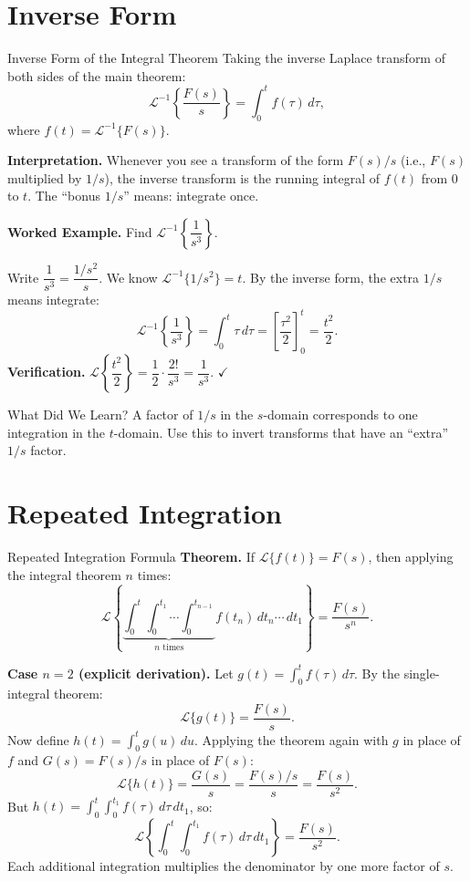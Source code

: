 \documentclass[12pt,a4paper]{article}
\begin{document}
\section{Inverse Form}

\begin{infobox}{Inverse Form of the Integral Theorem}
Taking the inverse Laplace transform of both sides of the main theorem:
\[
  \mathcal{L}^{-1}\!\left\{\frac{F(s)}{s}\right\} = \int_0^t f(\tau)\,d\tau,
\]
where $f(t) = \mathcal{L}^{-1}\{F(s)\}$.

\medskip
\noindent\textbf{Interpretation.} Whenever you see a transform of the form $F(s)/s$ (i.e.,
$F(s)$ multiplied by $1/s$), the inverse transform is the running integral of $f(t)$
from $0$ to $t$. The ``bonus $1/s$'' means: integrate once.

\medskip
\noindent\textbf{Worked Example.} Find $\mathcal{L}^{-1}\!\left\{\dfrac{1}{s^3}\right\}$.

Write $\dfrac{1}{s^3} = \dfrac{1/s^2}{s}$. We know $\mathcal{L}^{-1}\{1/s^2\} = t$.
By the inverse form, the extra $1/s$ means integrate:
\[
  \mathcal{L}^{-1}\!\left\{\frac{1}{s^3}\right\} = \int_0^t \tau\,d\tau
  = \left[\frac{\tau^2}{2}\right]_0^t = \frac{t^2}{2}.
\]
\textbf{Verification.} $\mathcal{L}\!\left\{\dfrac{t^2}{2}\right\}
= \dfrac{1}{2}\cdot\dfrac{2!}{s^3} = \dfrac{1}{s^3}$. $\checkmark$
\end{infobox}

\begin{learnbox}{What Did We Learn?}
A factor of $1/s$ in the $s$-domain corresponds to one integration in the $t$-domain.
Use this to invert transforms that have an ``extra'' $1/s$ factor.
\end{learnbox}

\section{Repeated Integration}

\begin{infobox}{Repeated Integration Formula}
\textbf{Theorem.} If $\mathcal{L}\{f(t)\} = F(s)$, then applying the integral theorem
$n$ times:
\[
  \mathcal{L}\!\left\{
    \underbrace{\int_0^t\!\int_0^{t_1}\!\cdots\!\int_0^{t_{n-1}}}_{n\text{ times}}
    f(t_n)\,dt_n\cdots\,dt_1
  \right\} = \frac{F(s)}{s^n}.
\]

\medskip
\noindent\textbf{Case $n = 2$ (explicit derivation).} Let
$g(t) = \int_0^t f(\tau)\,d\tau$. By the single-integral theorem:
\[
  \mathcal{L}\{g(t)\} = \frac{F(s)}{s}.
\]
Now define $h(t) = \int_0^t g(u)\,du$. Applying the theorem again with $g$ in place
of $f$ and $G(s) = F(s)/s$ in place of $F(s)$:
\[
  \mathcal{L}\{h(t)\} = \frac{G(s)}{s} = \frac{F(s)/s}{s} = \frac{F(s)}{s^2}.
\]
But $h(t) = \int_0^t\!\int_0^{t_1} f(\tau)\,d\tau\,dt_1$, so:
\[
  \mathcal{L}\!\left\{\int_0^t\!\int_0^{t_1} f(\tau)\,d\tau\,dt_1\right\}
  = \frac{F(s)}{s^2}.
\]
Each additional integration multiplies the denominator by one more factor of $s$.
\end{infobox}
\end{document}
